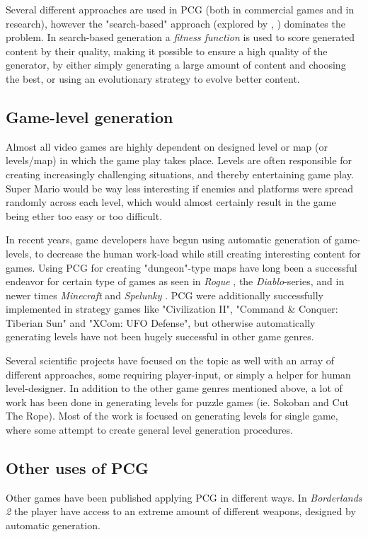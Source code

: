 \documentclass[a4paper,titlepage,final]{report}
\begin{document}
Several different approaches are used in PCG (both in commercial games and in research), however the "search-based" approach (explored by \citet{togelius11search}, \citet{pcgbook:ch2}) dominates the problem.
In search-based generation a \textit{fitness function} is used to score generated content by their quality, making it possible to ensure a high quality of the generator, by either simply generating a large amount of content and choosing the best, or using an evolutionary strategy to evolve better content.




\subsection{Game-level generation}
Almost all video games are highly dependent on designed level or map (or levels/map) in which the game play takes place. Levels are often responsible for creating increasingly challenging situations, and thereby entertaining game play. Super Mario would be way less interesting if enemies and platforms were spread randomly across each level, which would almost certainly result in the game being ether too easy or too difficult.

In recent years, game developers have begun using automatic generation of game-levels, to decrease the human work-load while still creating interesting content for games. Using PCG for creating "dungeon"-type maps have long been a successful endeavor for certain type of games as seen in \textit{Rogue} \citeyearpar{game:rogue}, the \textit{Diablo}-series, and in newer times \textit{Minecraft} \citeyearpar{game:minecraft} and \textit{Spelunky} \citeyearpar{game:spelunky}. PCG were additionally successfully implemented in strategy games like "Civilization II", "Command \& Conquer: Tiberian Sun" and "XCom: UFO Defense", but otherwise automatically generating levels have not been hugely successful in other game genres.

Several scientific projects have focused on the topic as well with an array of different approaches, some requiring player-input, or simply a helper for human level-designer. In addition to the other game genres mentioned above, a lot of work has been done in generating levels for puzzle games (ie. Sokoban and Cut The Rope).
Most of the work is focused on generating levels for single game, where some attempt to create general level generation procedures.


\subsection{Other uses of PCG}
Other games have been published applying PCG in different ways. In \textit{Borderlands 2} \citeyearpar{game:borderlands} the player have access to an extreme amount of different weapons, designed by automatic generation.
\end{document}
